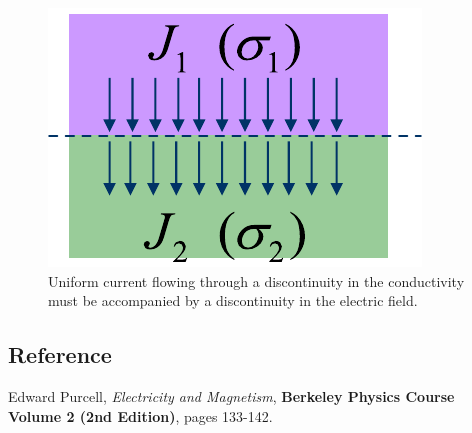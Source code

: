 \begin{figure}[tb]
\begin{center}
\includegraphics[width=.25\columnwidth]{slide50}
\end{center}
\caption{Uniform current flowing through a discontinuity in the conductivity must be accompanied by a discontinuity in the electric field. } \label{fig:slide50}
\end{figure}











\subsection{Reference}



Edward Purcell, \textit{Electricity and Magnetism}, \textbf{Berkeley Physics Course Volume 2 (2nd Edition)}, pages 133-142.